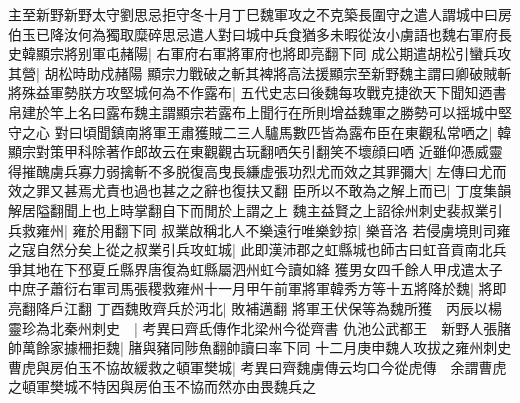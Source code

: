 主至新野新野太守劉思忌拒守冬十月丁巳魏軍攻之不克築長圍守之遣人謂城中曰房伯玉已降汝何為獨取糜碎思忌遣人對曰城中兵食猶多未暇從汝小虜語也魏右軍府長史韓顯宗將别軍屯赭陽|{
	右軍府右軍將軍府也將即亮翻下同}
成公期遣胡松引蠻兵攻其營|{
	胡松時助戍赭陽}
顯宗力戰破之斬其裨將高法援顯宗至新野魏主謂曰卿破賊斬將殊益軍勢朕方攻堅城何為不作露布|{
	五代史志曰後魏每攻戰克捷欲天下聞知迺書帛建於竿上名曰露布魏主謂顯宗若露布上聞行在所則增益魏軍之勝勢可以揺城中堅守之心}
對曰頃聞鎮南將軍王肅獲賊二三人驢馬數匹皆為露布臣在東觀私常哂之|{
	韓顯宗對策甲科除著作郎故云在東觀觀古玩翻哂矢引翻笑不壞顔曰哂}
近雖仰憑威靈得摧醜虜兵寡力弱擒斬不多脱復高曳長縑虚張功烈尤而效之其罪彌大|{
	左傳曰尤而效之罪又甚焉尤責也過也甚之之辭也復扶又翻}
臣所以不敢為之解上而已|{
	丁度集韻解居隘翻聞上也上時掌翻自下而閒於上謂之上}
魏主益賢之上詔徐州刺史裴叔業引兵救雍州|{
	雍於用翻下同}
叔業啟稱北人不樂遠行唯樂鈔掠|{
	樂音洛}
若侵虜境則司雍之寇自然分矣上從之叔業引兵攻虹城|{
	此即漢沛郡之虹縣城也師古曰虹音貢南北兵爭其地在下邳夏丘縣界唐復為虹縣屬泗州虹今讀如絳}
獲男女四千餘人甲戌遣太子中庶子蕭衍右軍司馬張稷救雍州十一月甲午前軍將軍韓秀方等十五將降於魏|{
	將即亮翻降戶江翻}
丁酉魏敗齊兵於沔北|{
	敗補邁翻}
將軍王伏保等為魏所獲　丙辰以楊靈珍為北秦州刺史　|{
	考異曰齊氐傳作北梁州今從齊書}
仇池公武都王　新野人張䐗帥萬餘家據柵拒魏|{
	䐗與豬同陟魚翻帥讀曰率下同}
十二月庚申魏人攻拔之雍州刺史曹虎與房伯玉不協故緩救之頓軍樊城|{
	考異曰齊魏虜傳云均口今從虎傳　余謂曹虎之頓軍樊城不特因與房伯玉不協而然亦由畏魏兵之}


